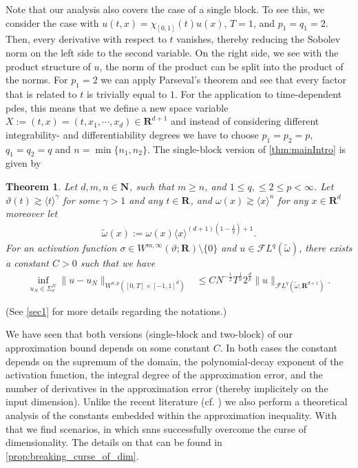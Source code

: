 \documentclass[a4paper]{article}
\newcommand{\nn}[1]{\mathbf{N}^{#1}}
\newcommand{\rr}[1]{\mathbf{R}^{#1}}
\newcommand{\eabs}[1]{\langle #1\rangle}     %
\newcommand{\norm}[2]{\|#1\|_{#2}}
\newcommand{\F}[0]{\mathscr{F}}
\newcommand{\FL}[1]{\F L^{#1}}
\newcommand{\chF}[1]{\chi_{#1}}
\newcommand{\ch}[2]{\chF{#1}(#2)}
\numberwithin{equation}{section}
\newtheorem{theorem}{Theorem}[section]
\theoremstyle{remark}
\begin{document}
Note that our analysis also covers the case of a single block.
To see this, we consider the case with $u(t,x)=\ch{[0,1]}{t}u(x)$, $T=1$, and $p_1=q_1=2$.
Then, every derivative with respect to $t$ vanishes,
thereby reducing the Sobolev norm on the left side to the second variable.
On the right side, we see with the product structure of $u$,
the norm of the product can be split into the product of the norms.
For $p_1=2$ we can apply Parseval's theorem and see that every factor that is related to $t$ is trivially equal to $1$.
For the application to time-dependent \glspl{pde},
this means that we define a new space variable
$X := (t, x)= (t, x_1, \cdots , x_d)\in \rr{d+1}$
and instead of considering different integrability-
and differentiability degrees we have to choose
$p_1=p_2=p$, $q_1=q_2=q$
and $n= \min\{n_1,n_2\}$.
The single-block version of \cref{thm:mainIntro} is given by
\begin{theorem}
    \label{thm:ReducedMainIntro}
    Let $d, m, n \in\nn{}$, such that \(m\geq n\),
    and $1\leq q,\leq 2\leq p< \infty$.
    Let $ \vartheta(t) \gtrsim \eabs{t}^{\gamma}$
    for some $\gamma>1$
    and any $t \in \rr{}$,
    and
    $\omega(x) \gtrsim \eabs{x}^{n}$ for any $x\in \rr{d}$
    moreover let
    \begin{align*}
        \tilde{\omega}(x):=
            \omega(x)
            \eabs{x}^{(d+1)(1-\frac{1}{q})+1}.
    \end{align*}
    For an activation function $\sigma\in W^{m,\infty}(\vartheta;\rr{}){\setminus}\{0\}$
    and $u\in \mathscr{F}L^{q}(\tilde{\omega})$,
    there exists a constant $C>0$
    such that we have
    \begin{align}
    \label{eq:ReducedApproximationBoundIntro}
        \inf_{u_N\in\Sigma_{\sigma}^{N} }
        \norm{u-u_N}{W^{n,p}([0,T]\times[-1,1]^d)}
        &\leq
        C N^{-\frac{1}{2}} T^{\frac{1}{p}}2^{\frac{d}{p}}
        \norm{u}{\FL{q}(\tilde{\omega};\rr{d+1})}.
    \end{align}
\end{theorem}
(See \cref{sec1} for more details regarding the notations.)


We have seen that both versions (single-block and two-block)
of our approximation bound depends on some constant $C$.
In both cases the constant depends on the supremum of the domain,
the polynomial-decay exponent of the activation function,
the integral degree of the approximation error,
and the number of derivatives in the approximation error (thereby implicitely on the input dimension).
Unlike the recent literature (cf. \cite{Ma22UniformApproximationRates}) we also perform a theoretical analysis of the constants embedded within the approximation inequality.
With that we find scenarios, in which \glspl{snn} successfully overcome the curse of dimensionality.
The details on that can be found in \cref{prop:breaking_curse_of_dim}.
\end{document}
